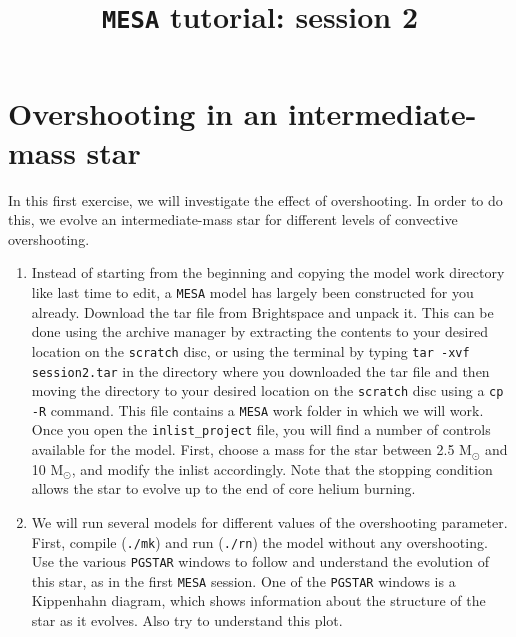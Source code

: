 \documentclass[11pt,a4paper]{article}
\begin{document}
\title{\textbf{\texttt{MESA} tutorial: session 2}}
\author{}
\date{}
\maketitle

\section{Overshooting in an intermediate-mass star}

In this first exercise, we will investigate the effect of overshooting. In order to do this, we evolve an intermediate-mass star for different levels of convective overshooting.
\begin{enumerate}
\item Instead of starting from the beginning and copying the model work directory like last time to edit, a \texttt{MESA} model has largely been constructed for you already. Download the tar file from Brightspace and unpack it. This can be done using the archive manager by extracting the contents to your desired location on the \texttt{scratch} disc, or using the terminal by typing \verb|tar -xvf session2.tar| in the directory where you downloaded the tar file and then moving the directory to your desired location on the \texttt{scratch} disc using a \texttt{cp -R} command. This file contains a \texttt{MESA} work folder in which we will work. Once you open the \verb|inlist_project| file, you will find a number of controls available for the model. First, choose a mass for the star between 2.5 M$_\odot$ and 10 M$_\odot$, and modify the inlist accordingly. Note that the stopping condition allows the star to evolve up to the end of core helium burning. 
\item We will run several models for different values of the overshooting parameter. First, compile (\verb|./mk|) and run (\verb|./rn|) the model without any overshooting. Use the various \texttt{PGSTAR} windows to follow and understand the evolution of this star, as in the first \texttt{MESA} session. One of the \texttt{PGSTAR} windows is a Kippenhahn diagram, which shows information about the structure of the star as it evolves. Also try to understand this plot. 

\end{enumerate}
\end{document}
